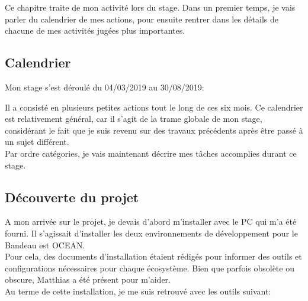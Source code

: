 \documentclass{rapport}
\begin{document}
Ce chapitre traite de mon activité lors du stage. Dans un premier temps, je vais parler du calendrier de mes actions, pour ensuite rentrer dans les détails de chacune de mes activités jugées plus importantes.

\subsection{Calendrier}

Mon stage s'est déroulé du 04/03/2019 au 30/08/2019:\\


Il a consisté en plusieurs petites actions tout le long de ces six mois. Ce calendrier est relativement général, car il s'agit de la trame globale de mon stage, considérant le fait  que je suis revenu sur des travaux précédents après être passé à un sujet différent.\\

Par ordre catégories, je vais maintenant décrire mes tâches accomplies durant ce stage. 

\newpage
\subsection{Découverte du projet}

A mon arrivée sur le projet, je devais d'abord m'installer avec le PC qui m'a été fourni. Il s'agissait d'installer les deux environnements de développement pour le Bandeau est OCEAN.\\
Pour cela, des documents d'installation étaient rédigés pour informer des outils et configurations nécessaires pour chaque écosystème. Bien que parfois obsolète ou obscure, Matthias a été présent pour m'aider.\\

Au terme de cette installation, je me suis retrouvé avec les outils suivant:\\
\end{document}

